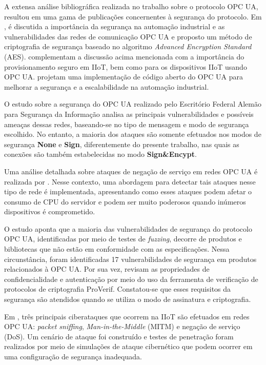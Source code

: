     A extensa análise bibliográfica realizada no trabalho sobre o protocolo OPC UA, resultou em uma gama de publicações concernentes à segurança do protocolo. Em \cite{luo2020}, é discutida a importância da segurança na automação industrial e as vulnerabilidades das redes de comunicação OPC UA e proposto um método de criptografia de segurança baseado no algoritmo \textit{Advanced Encryption Standard} (AES).  complementam a discussão acima mencionada com a importância do provisionamento seguro em IIoT, bem como \cite{kohnhauser2022} para os dispositivos IIoT usando OPC UA.  projetam uma implementação de código aberto do OPC UA para melhorar a segurança e a escalabilidade na automação industrial.

    O estudo sobre a segurança do OPC UA realizado pelo Escritório Federal Alemão para Segurança da Informação \cite{bsi2017} analisa as principais vulnerabilidades e possíveis ameaças dessas redes, baseando-se no tipo de mensagem e modo de segurança escolhido. No entanto, a maioria dos ataques são somente efetuados nos modos de segurança \textbf{None} e \textbf{Sign}, diferentemente do presente trabalho, nas quais as conexões são também estabelecidas no modo \textbf{Sign\&Encypt}.

    Uma análise detalhada sobre ataques de negação de serviço em redes OPC UA é realizada por . Nesse contexto, uma abordagem para detectar tais ataques nesse tipo de rede é implementada, apresentando como esses ataques podem afetar o consumo de CPU do servidor e podem ser muito poderosos quando inúmeros dispositivos é comprometido.

    O estudo \cite{kaspersky2018} aponta que a maioria das vulnerabilidades de segurança do protocolo OPC UA, identificadas por meio de testes de \textit{fuzzing}, decorre de produtos e bibliotecas que não estão em conformidade com as especificações. Nessa circunstância, foram identificadas 17 vulnerabilidades de segurança em produtos relacionados à OPC UA. Por sua vez,  revisam as propriedades de confidencialidade e autenticação por meio do uso da ferramenta de verificação de protocolos de criptografia ProVerif. Constatou-se que esses requisitos da segurança são atendidos quando se utiliza o modo de assinatura e criptografia.

    Em \cite{varadarajan2022}, três principais ciberataques que ocorrem na IIoT são efetuados em redes OPC UA: \textit{packet sniffing}, \textit{Man-in-the-Middle} (MITM) e negação de serviço (DoS). Um cenário de ataque foi construído e testes de penetração foram realizados por meio de simulações de ataque cibernético que podem ocorrer em uma configuração de segurança inadequada.


